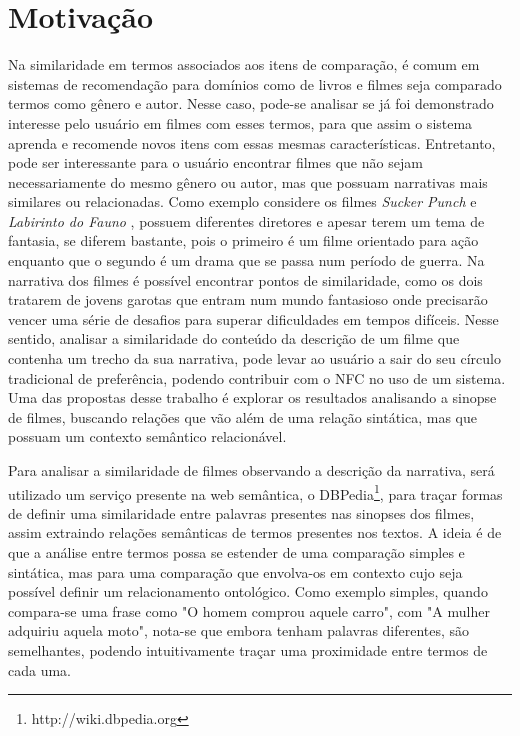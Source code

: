\section{Motivação}
Na similaridade em termos associados aos itens de comparação, é comum em sistemas de recomendação para domínios como de livros e filmes seja comparado termos como gênero e autor. Nesse caso, pode-se analisar se já foi demonstrado interesse pelo usuário em filmes com esses termos, para que assim o sistema aprenda e recomende novos itens com essas mesmas características. Entretanto, pode ser interessante para o usuário encontrar filmes que não sejam necessariamente do mesmo gênero ou autor, mas que possuam narrativas mais similares ou relacionadas. Como exemplo considere os filmes \textit{Sucker Punch} \citep{SuckerPunch2011} e \textit{Labirinto do Fauno} \citep{LaberintoFauno2006}, possuem diferentes diretores e apesar terem um tema de fantasia, se diferem bastante, pois o primeiro é um filme orientado para ação enquanto que o segundo é um drama que se passa num período de guerra. Na narrativa dos filmes é possível encontrar pontos de similaridade, como os dois tratarem de jovens garotas que entram num mundo fantasioso onde precisarão vencer uma série de desafios para superar dificuldades em tempos difíceis. Nesse sentido, analisar a similaridade do conteúdo da descrição de um filme que contenha um trecho da sua narrativa, pode levar ao usuário a sair do seu círculo tradicional de preferência, podendo contribuir com o NFC no uso de um sistema. Uma das propostas desse trabalho é explorar os resultados analisando a sinopse de filmes, buscando relações que vão além de uma relação sintática, mas que possuam um contexto semântico relacionável.

Para analisar a similaridade de filmes observando a descrição da narrativa, será utilizado um serviço presente na web semântica, o DBPedia\footnote{http://wiki.dbpedia.org}, para traçar formas de definir uma similaridade entre palavras presentes nas sinopses dos filmes, assim extraindo relações semânticas de termos presentes nos textos. A ideia é de que a análise entre termos possa se estender de uma comparação simples e sintática, mas para uma comparação que envolva-os em contexto cujo seja possível definir um relacionamento ontológico. Como exemplo simples, quando compara-se uma frase como "O homem comprou aquele carro", com "A mulher adquiriu aquela moto", nota-se que embora tenham palavras diferentes, são semelhantes, podendo intuitivamente traçar uma proximidade entre termos de cada uma. 

